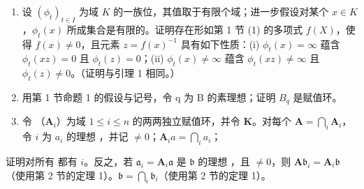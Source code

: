 
\begin{enumerate}
\def\labelenumi{\arabic{enumi}.}
\item
  设 \((\phi_{t})_{t\in I}\) 为域 \(K\) 的一族位，其值取于有限个域；进一步假设对某个 \(x\in K\)，\(\phi_t(x)\) 所成集合是有限的。证明存在形如第 1 节 (1) 的多项式 \(f(X)\)，使得 \(f(x)\neq 0\)，且元素 \(z = f(x)^{-1}\) 具有如下性质：(i) \(\phi_t(x) = \infty\) 蕴含 \(\phi_t(xz) = 0\) 且 \(\phi_t(z) = 0\)；(ii) \(\phi_t(x)\neq \infty\) 蕴含 \(\phi_t(xz)\neq \infty\) 且 \(\phi_t(z)\neq 0\)。（证明与引理 1 相同。）
\item
  用第 1 节命题 1 的假设与记号，令 q 为 B 的素理想；证明 \(B_{q}\) 是赋值环。
\item
  令 （\(\mathbf{A}_i\)）为域 \(1 \leqslant i \leqslant n\) 的两两独立赋值环，并令 \(\mathbf{K}\)。对每个 \(\mathbf{A} = \bigcap_{i} \mathbf{A}_i\)，令 \(i\) 为 \(a_i\) 的理想 ，并记 \(\neq 0\)；\(\mathbf{A}_i\)\(a = \bigcap_{i} a_i\)；
\end{enumerate}

证明对所有  都有 \(i\)。反之，若 \(\mathfrak{a}_i = \mathbf{A}_i\mathfrak{a}\) 是 \(\mathfrak{b}\) 的理想 ，且 \(\neq 0\)，则 \(\mathbf{A}\)\(\mathfrak{b}_i = \mathbf{A}_i\mathfrak{b}\)（使用第 2 节的定理 1）。\(\mathfrak{b} = \bigcap_i \mathfrak{b}_i\)（使用第 2 节的定理 1）。


